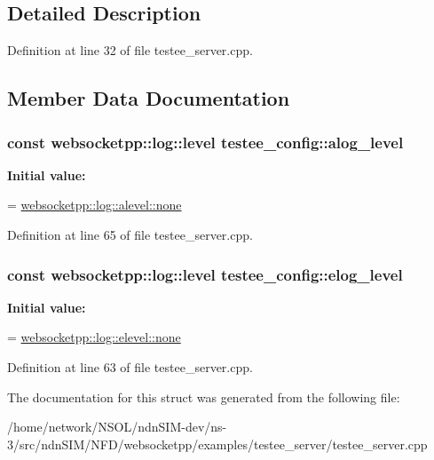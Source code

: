 \subsection{Detailed Description}


Definition at line 32 of file testee\+\_\+server.\+cpp.



\subsection{Member Data Documentation}
\subsubsection[{\texorpdfstring{alog\+\_\+level}{alog\_level}}]{\setlength{\rightskip}{0pt plus 5cm}const websocketpp\+::log\+::level testee\+\_\+config\+::alog\+\_\+level\hspace{0.3cm}{\ttfamily [static]}}\hypertarget{structtestee__config_af49d8b77cff03f1f66ff84d4d293c313}{}\label{structtestee__config_af49d8b77cff03f1f66ff84d4d293c313}
{\bfseries Initial value\+:}
\begin{DoxyCode}
=
        \hyperlink{structwebsocketpp_1_1log_1_1alevel_a4cf0520816094999975fe73081cf30f2}{websocketpp::log::alevel::none}
\end{DoxyCode}


Definition at line 65 of file testee\+\_\+server.\+cpp.

\subsubsection[{\texorpdfstring{elog\+\_\+level}{elog\_level}}]{\setlength{\rightskip}{0pt plus 5cm}const websocketpp\+::log\+::level testee\+\_\+config\+::elog\+\_\+level\hspace{0.3cm}{\ttfamily [static]}}\hypertarget{structtestee__config_ae934c27283c78b7e51499e723436265c}{}\label{structtestee__config_ae934c27283c78b7e51499e723436265c}
{\bfseries Initial value\+:}
\begin{DoxyCode}
=
        \hyperlink{structwebsocketpp_1_1log_1_1elevel_ae86395aa26ec2089e07fd63b62a549fa}{websocketpp::log::elevel::none}
\end{DoxyCode}


Definition at line 63 of file testee\+\_\+server.\+cpp.



The documentation for this struct was generated from the following file\+:\begin{DoxyCompactItemize}
\item 
/home/network/\+N\+S\+O\+L/ndn\+S\+I\+M-\/dev/ns-\/3/src/ndn\+S\+I\+M/\+N\+F\+D/websocketpp/examples/testee\+\_\+server/testee\+\_\+server.\+cpp\end{DoxyCompactItemize}
